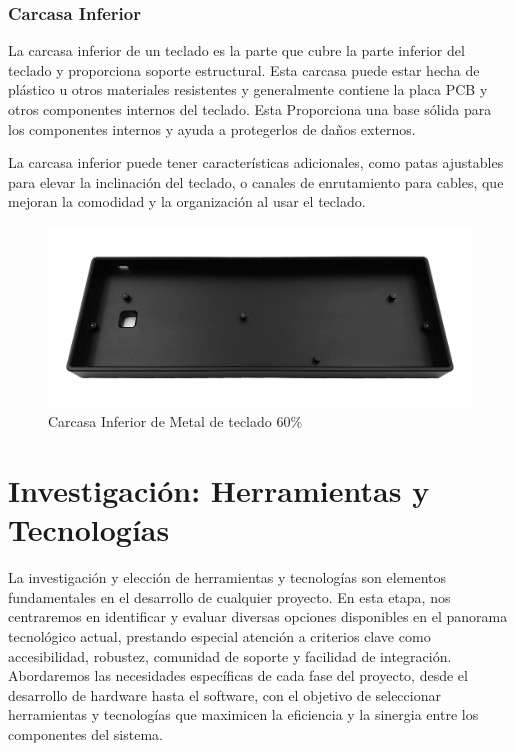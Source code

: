 \subsubsection{Carcasa Inferior}

La carcasa inferior de un teclado es la parte que cubre la parte inferior del teclado y proporciona soporte estructural. Esta carcasa puede estar hecha de plástico u otros materiales resistentes y generalmente contiene la placa \gls{PCB} y otros componentes internos del teclado. Esta Proporciona una base sólida para los componentes internos y ayuda a protegerlos de daños externos.

La carcasa inferior puede tener características adicionales, como patas ajustables para elevar la inclinación del teclado, o canales de enrutamiento para cables, que mejoran la comodidad y la organización al usar el teclado.

\begin{figure}[H]
    \centering
    \includegraphics[width=1\textwidth]{imagenes/Capitulos/Cap03/BottomCase.png}
    \caption{Carcasa Inferior de Metal de teclado 60\%}
    \label{fig:BottomCase}
\end{figure}

\section{Investigación: Herramientas y Tecnologías}

La investigación y elección de herramientas y tecnologías son elementos fundamentales en el desarrollo de cualquier proyecto. En esta etapa, nos centraremos en identificar y evaluar diversas opciones disponibles en el panorama tecnológico actual, prestando especial atención a criterios clave como accesibilidad, robustez, comunidad de soporte y facilidad de integración. Abordaremos las necesidades específicas de cada fase del proyecto, desde el desarrollo de hardware hasta el software, con el objetivo de seleccionar herramientas y tecnologías que maximicen la eficiencia y la sinergia entre los componentes del sistema.

